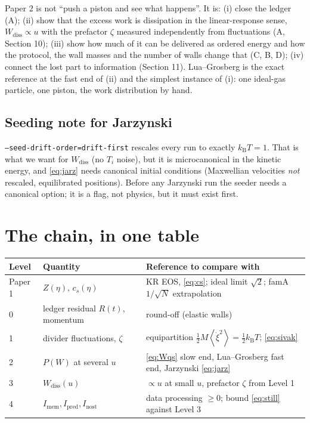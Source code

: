 \documentclass[11pt,a4paper]{article}
\newcommand{\kT}{k_{\mathrm B}T}
\newcommand{\avg}[1]{\left\langle #1 \right\rangle}
\begin{document}
\begin{why}
Paper 2 is not ``push a piston and see what happens''. It is: (i) close the ledger (A); (ii) show that the excess work is dissipation in the linear-response sense, $W_{\mathrm{diss}}\propto u$ with the prefactor $\zeta$ measured independently from fluctuations (A, Section 10); (iii) show how much of it can be delivered as ordered energy and how the protocol, the wall masses and the number of walls change that (C, B, D); (iv) connect the lost part to information (Section 11). Lua--Grosberg is the exact reference at the fast end of (ii) and the simplest instance of (i): one ideal-gas particle, one piston, the work distribution by hand.
\end{why}

\subsection{Seeding note for Jarzynski}
\texttt{--seed-drift-order=drift-first} rescales every run to exactly $\kT = 1$. That is what we want for $W_{\mathrm{diss}}$ (no $T_i$ noise), but it is microcanonical in the kinetic energy, and \eqref{eq:jarz} needs canonical initial conditions (Maxwellian velocities \emph{not} rescaled, equilibrated positions). Before any Jarzynski run the seeder needs a canonical option; it is a flag, not physics, but it must exist first.

\section{The chain, in one table}
\begin{center}
\small
\begin{tabular}{@{}lll@{}}
\toprule
Level & Quantity & Reference to compare with\\
\midrule
Paper 1 & $Z(\eta)$, $c_s(\eta)$ & KR EOS, \eqref{eq:cs}; ideal limit $\sqrt2$; famA $1/\sqrt N$ extrapolation\\
0 & ledger residual $R(t)$, momentum & round-off (elastic walls)\\
1 & divider fluctuations, $\zeta$ & equipartition $\tfrac12M\avg{\dot\xi^2} = \tfrac12\kT$; \eqref{eq:sivak}\\
2 & $P(W)$ at several $u$ & \eqref{eq:Wqs} slow end, Lua--Grosberg fast end, Jarzynski \eqref{eq:jarz}\\
3 & $W_{\mathrm{diss}}(u)$ & $\propto u$ at small $u$, prefactor $\zeta$ from Level 1\\
4 & $I_{\mathrm{mem}}, I_{\mathrm{pred}}, I_{\mathrm{nost}}$ & data processing $\ge0$; bound \eqref{eq:still} against Level 3\\
\bottomrule
\end{tabular}
\end{center}
\end{document}
